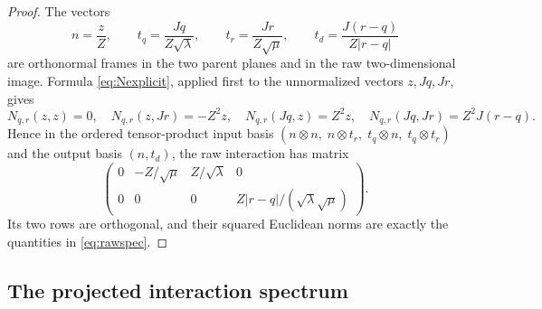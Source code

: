 \documentclass[11pt]{article}
\theoremstyle{definition}
\theoremstyle{remark}
\theoremstyle{plain}
\begin{document}
\begin{proof}
The vectors
\[
n=\frac zZ,
\qquad
t_{q}=\frac{Jq}{Z\sqrt\lambda},
\qquad
t_{r}=\frac{Jr}{Z\sqrt\mu},
\qquad
t_{d}=\frac{J(r-q)}{Z|r-q|}
\]
are orthonormal frames in the two parent planes and in the raw
two-dimensional image. Formula \eqref{eq:Nexplicit}, applied first to the
unnormalized vectors $z,Jq,Jr$, gives
\[
N_{q,r}(z,z)=0,
\quad
N_{q,r}(z,Jr)=-Z^{2}z,
\quad
N_{q,r}(Jq,z)=Z^{2}z,
\quad
N_{q,r}(Jq,Jr)=Z^{2}J(r-q).
\]
Hence in the ordered tensor-product input basis
$(n\otimes n,\;n\otimes t_{r},\;t_{q}\otimes n,\;t_{q}\otimes t_{r})$ and the
output basis $(n,t_{d})$, the raw interaction has matrix
\begin{equation}
\label{eq:rawmatrix}
\begin{pmatrix}
0&-Z/\sqrt\mu&Z/\sqrt\lambda&0\\
0&0&0&Z|r-q|/(\sqrt\lambda\sqrt\mu)
\end{pmatrix}.
\end{equation}
Its two rows are orthogonal, and their squared Euclidean norms are exactly the
quantities in \eqref{eq:rawspec}.
\end{proof}

\subsection{The projected interaction spectrum}
\label{subsec:projspec}
\end{document}
